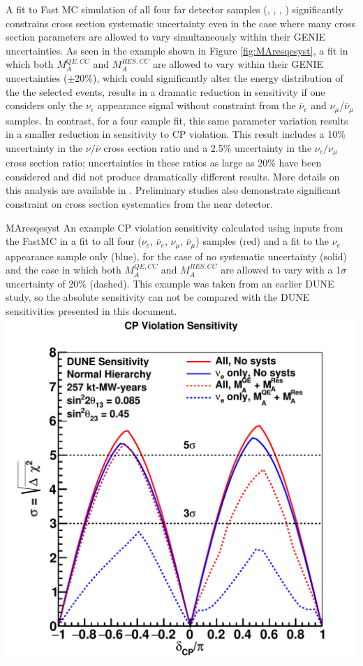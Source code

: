 A fit to Fast MC simulation of all four far detector samples
(\nue, \anue, \numu, \anumu) significantly
constrains cross section systematic uncertainty even in the case where many
cross section parameters are allowed to vary simultaneously within their
GENIE uncertainties. As seen in the example shown in Figure
\ref{fig:MAresqesyst}, 
a fit in which both $M_A^{QE,CC}$ and 
$M_A^{RES,CC}$ are allowed to vary within their GENIE uncertainties 
($\pm$20\%), which could significantly alter the energy distribution of the 
the selected events, results in a dramatic reduction in sensitivity if one 
considers only the $\nu_e$ appearance signal without constraint from the 
$\bar{\nu}_e$ and $\nu_{\mu}$/$\bar{\nu}_{\mu}$ samples.
In contrast, for a four sample fit,
this same parameter variation results in a smaller reduction in
sensitivity to CP violation.
This result includes a 10\% uncertainty in the $\nu/\bar{\nu}$
cross section ratio and a 2.5\% uncertainty in the $\nu_e/\nu_{\mu}$
cross section ratio; uncertainties in these ratios as large as 20\% have
been considered and did not produce dramatically different results.
More details on this analysis are available in \cite{Bass:2014vta}.
Preliminary studies also demonstrate significant constraint on cross section systematics
from the near detector.
%
\begin{cdrfigure}{MAresqesyst}{
An example CP violation sensitivity calculated using inputs from the 
  FastMC in a fit to all four ($\nu_e$, $\overline\nu_e$, $\nu_{\mu}$, 
  $\overline\nu_{\mu}$) samples (red) and a fit to the $\nu_e$ appearance sample 
  only (blue), for the case of no systematic uncertainty (solid) and the case in
  which both $M_A^{QE,CC}$ and $M_A^{RES,CC}$ are allowed to vary with a
  1$\sigma$ uncertainty of 20\% (dashed). This example was taken from an earlier
  DUNE study, so the absolute sensitivity can not be compared with the DUNE 
  sensitivities presented in this document.}
\includegraphics[width=0.5\linewidth]{volume-physics/figures/cpv_QELCCMA_RESCCMA.pdf}
\end{cdrfigure}


